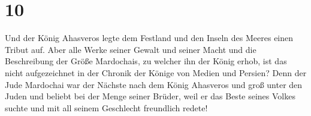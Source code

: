 \hypertarget{section-9}{%
\section{10}\label{section-9}}

 Und der König Ahasveros legte dem Festland und den Inseln
des Meeres einen Tribut auf.  Aber alle Werke seiner
Gewalt und seiner Macht und die Beschreibung der Größe Mardochais, zu
welcher ihn der König erhob, ist das nicht aufgezeichnet in der Chronik
der Könige von Medien und Persien?  Denn der Jude
Mardochai war der Nächste nach dem König Ahasveros und groß unter den
Juden und beliebt bei der Menge seiner Brüder, weil er das Beste seines
Volkes suchte und mit all seinem Geschlecht freundlich redete!
